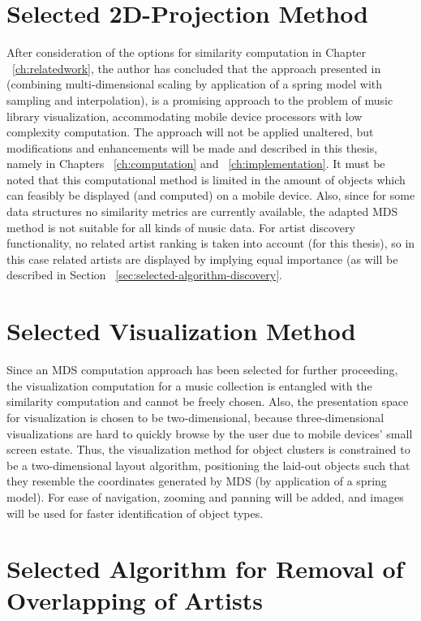 \section{Selected 2D-Projection Method}

After consideration of the options for similarity computation in Chapter ~\ref{ch:relatedwork}, the author has concluded that the approach presented in \cite{Morrison:2003:FMS} (combining multi-dimensional scaling by application of a spring model with sampling and interpolation), is a promising approach to the problem of music library visualization, accommodating mobile device processors with low complexity computation. The approach will not be applied unaltered, but modifications and enhancements will be made and described in this thesis, namely in Chapters ~\ref{ch:computation} and ~\ref{ch:implementation}.
It must be noted that this computational method is limited in the amount of objects which can feasibly be displayed (and computed) on a mobile device. Also, since for some data structures no similarity metrics are currently available, the adapted MDS method is not suitable for all kinds of music data. For artist discovery functionality, no related artist ranking is taken into account (for this thesis), so in this case related artists are displayed by implying equal importance (as will be described in Section ~\ref{sec:selected-algorithm-discovery}.

\section{Selected Visualization Method}

Since an MDS computation approach has been selected for further proceeding, the visualization computation for a music collection is entangled with the similarity computation and cannot be freely chosen. Also, the presentation space for visualization is chosen to be two-dimensional, because three-dimensional visualizations are hard to quickly browse by the user due to mobile devices' small screen estate. Thus, the visualization method for object clusters is constrained to be a two-dimensional layout algorithm, positioning the laid-out objects such that they resemble the coordinates generated by MDS (by application of a spring model). For ease of navigation, zooming and panning will be added, and images will be used for faster identification of object types.

\section{Selected Algorithm for Removal of Overlapping of Artists}

